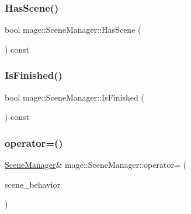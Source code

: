 \hypertarget{classmage_1_1_scene_manager_ac767593112ea1d8b47cc79283cf7c47e}{}\label{classmage_1_1_scene_manager_ac767593112ea1d8b47cc79283cf7c47e} 
\subsubsection{\texorpdfstring{Has\+Scene()}{HasScene()}}
{\footnotesize\ttfamily bool mage\+::\+Scene\+Manager\+::\+Has\+Scene (\begin{DoxyParamCaption}{ }\end{DoxyParamCaption}) const\hspace{0.3cm}{\ttfamily [noexcept]}}

\hypertarget{classmage_1_1_scene_manager_adeb1fd1d9f40229ccb0ef8adfb55f4cc}{}\label{classmage_1_1_scene_manager_adeb1fd1d9f40229ccb0ef8adfb55f4cc} 
\subsubsection{\texorpdfstring{Is\+Finished()}{IsFinished()}}
{\footnotesize\ttfamily bool mage\+::\+Scene\+Manager\+::\+Is\+Finished (\begin{DoxyParamCaption}{ }\end{DoxyParamCaption}) const\hspace{0.3cm}{\ttfamily [noexcept]}}

\hypertarget{classmage_1_1_scene_manager_a90c17a35f737879fa07acb28f6d787af}{}\label{classmage_1_1_scene_manager_a90c17a35f737879fa07acb28f6d787af} 
\subsubsection{\texorpdfstring{operator=()}{operator=()}\hspace{0.1cm}{\footnotesize\ttfamily [1/2]}}
{\footnotesize\ttfamily \hyperlink{classmage_1_1_scene_manager}{Scene\+Manager}\& mage\+::\+Scene\+Manager\+::operator= (\begin{DoxyParamCaption}\item[{const \hyperlink{classmage_1_1_scene_manager}{Scene\+Manager} \&}]{scene\+\_\+behavior }\end{DoxyParamCaption})\hspace{0.3cm}{\ttfamily [delete]}}


